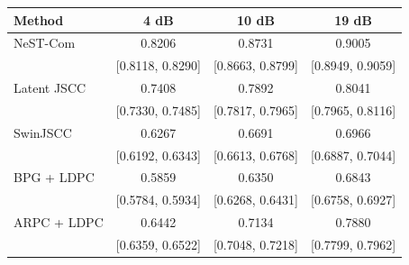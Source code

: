 \begin{tabular}{lccc}
\toprule
Method & 4 dB & 10 dB & 19 dB \\
\midrule
NeST-Com & 0.8206 & 0.8731 & 0.9005 \\
 & [0.8118, 0.8290] & [0.8663, 0.8799] & [0.8949, 0.9059] \\
Latent JSCC & 0.7408 & 0.7892 & 0.8041 \\
 & [0.7330, 0.7485] & [0.7817, 0.7965] & [0.7965, 0.8116] \\
SwinJSCC & 0.6267 & 0.6691 & 0.6966 \\
 & [0.6192, 0.6343] & [0.6613, 0.6768] & [0.6887, 0.7044] \\
BPG + LDPC & 0.5859 & 0.6350 & 0.6843 \\
 & [0.5784, 0.5934] & [0.6268, 0.6431] & [0.6758, 0.6927] \\
ARPC + LDPC & 0.6442 & 0.7134 & 0.7880 \\
 & [0.6359, 0.6522] & [0.7048, 0.7218] & [0.7799, 0.7962] \\
\bottomrule
\end{tabular}
